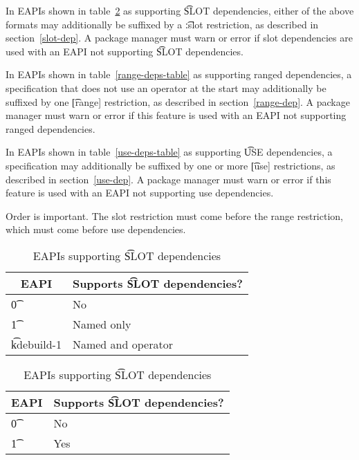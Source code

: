 In EAPIs shown in table~\ref{slot-deps-table} as supporting \t{SLOT} dependencies, either of the
above formats may additionally be suffixed by a \t{:slot} restriction, as described in
section~\ref{slot-dep}. A package manager must warn or error if slot dependencies are used with an
EAPI not supporting \t{SLOT} dependencies.

\IFKDEBUILDELSE
{
    In EAPIs shown in table~\ref{range-deps-table} as supporting ranged dependencies, a
    specification that does not use an operator at the start may additionally be suffixed by one
    \t{[range]} restriction, as described in section~\ref{range-dep}. A package manager must warn or
    error if this feature is used with an EAPI not supporting ranged dependencies.

    In EAPIs shown in table~\ref{use-deps-table} as supporting \t{USE} dependencies, a specification
    may additionally be suffixed by one or more \t{[use]} restrictions, as described in
    section~\ref{use-dep}. A package manager must warn or error if this feature is used with an EAPI
    not supporting use dependencies.

    \note Order is important. The slot restriction must come before the range restriction, which
    must come before use dependencies.
}{
}

\IFKDEBUILDELSE
{
    \begin{table}
    \centering
    \caption{EAPIs supporting \t{SLOT} dependencies} \label{slot-deps-table}
    \begin{tabular}{ l l }
        \toprule
            \multicolumn{1}{c}{\textbf{EAPI}} &
            \multicolumn{1}{c}{\textbf{Supports \t{SLOT} dependencies?}} \\
            \midrule
    \t{0} & No \\
    \t{1} & Named only \\
    \t{kdebuild-1} & Named and operator \\
    \bottomrule
    \end{tabular}
    \end{table}
}{
    \begin{table}
    \centering
    \caption{EAPIs supporting \t{SLOT} dependencies} \label{slot-deps-table}
    \begin{tabular}{ l l }
        \toprule
            \multicolumn{1}{c}{\textbf{EAPI}} &
            \multicolumn{1}{c}{\textbf{Supports \t{SLOT} dependencies?}} \\
            \midrule
    \t{0} & No \\
    \t{1} & Yes \\
    \bottomrule
    \end{tabular}
    \end{table}
}

